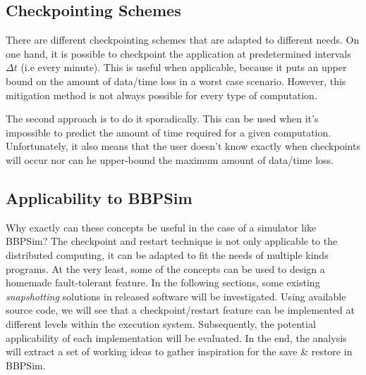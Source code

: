 {\subsection*{Checkpointing Schemes}
There are different checkpointing schemes that are adapted to different needs. On one hand, it is possible to checkpoint the application at predetermined intervals $\Delta t$ (i.e every minute). This is useful when applicable, because it puts an upper bound on the amount of data/time loss in a worst case scenario. However, this mitigation method is not always possible for every type of computation. 

The second approach is to do it sporadically. This can be used when it's impossible to predict the amount of time required for a given computation. Unfortunately, it also means that the user doesn't know exactly when checkpoints will occur nor can he upper-bound the maximum amount of data/time loss.

\subsection*{Applicability to BBPSim}
Why exactly can these concepts be useful in the case of a simulator like BBPSim? The checkpoint and restart technique is not only applicable to the distributed computing, it can be adapted to fit the needs of multiple kinds programs. At the very least, some of the concepts can be used to design a homemade fault-tolerant feature. In the following sections, some existing \textit{snapshotting} solutions in released software will be investigated. Using available source code, we will see that a checkpoint/restart feature can be implemented at different levels within the execution system. Subsequently, the potential applicability of each implementation will be evaluated. In the end, the analysis will extract a set of working ideas to gather inspiration for the save \& restore in BBPSim.


}
